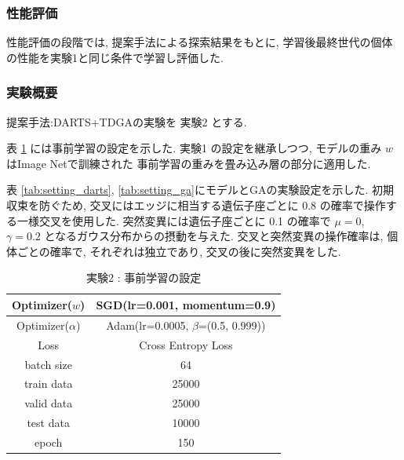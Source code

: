 

\subsubsection{性能評価}

性能評価の段階では, 提案手法による探索結果をもとに,
学習後最終世代の個体の性能を実験1と同じ条件で学習し評価した.


\changeindent{0cm}
\subsubsection{実験概要}
\label{sec:pred.02_03}
\changeindent{2cm}

提案手法:DARTS+TDGAの実験を 実験2 とする.

表 \ref{tab:setting_pretrain} には事前学習の設定を示した.
実験1 の設定を継承しつつ,
モデルの重み $w$ はImage Net\cite{deng2009imagenet}で訓練された
事前学習の重みを畳み込み層の部分に適用した.

表 \ref{tab:setting_darts}, \ref{tab:setting_ga}にモデルとGAの実験設定を示した.
初期収束を防ぐため, 交叉にはエッジに相当する遺伝子座ごとに 0.8 の確率で操作する一様交叉を使用した.
突然変異には遺伝子座ごとに 0.1 の確率で $\mu=0$, $\gamma=0.2$ となるガウス分布からの摂動を与えた.
交叉と突然変異の操作確率は, 個体ごとの確率で, それぞれは独立であり, 交叉の後に突然変異をした.


\begin{table}[tb]
  \begin{center}
    \caption{実験2 : 事前学習の設定}
  	\vspace{3mm}
    \begin{tabular}{|c|c|} \hline
      Optimizer($w$) & SGD(lr=0.001, momentum=0.9) \\ \hline
      Optimizer($\alpha$) & Adam(lr=0.0005, $\beta$=(0.5, 0.999)) \\ \hline
      Loss & Cross Entropy Loss \\ \hline
      batch size & 64 \\ \hline
      train data & 25000\\ \hline
      valid data & 25000\\ \hline
      test data &  10000\\ \hline
      epoch & 150\\ \hline
    \end{tabular}
    \label{tab:setting_pretrain}
  \end{center}
\end{table}

